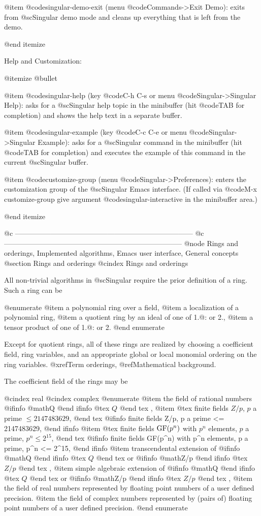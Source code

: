 @item @code{singular-demo-exit} (menu @code{Commands->Exit Demo}):
exits from @sc{Singular} demo mode and cleans up everything that is
left from the demo.

@end itemize

Help and Customization:

@itemize @bullet

@item @code{singular-help} (key @code{C-h C-s} or menu
@code{Singular->Singular Help}): asks for a @sc{Singular} help topic in
the minibuffer (hit @code{TAB} for completion) and shows the help text
in a separate buffer.

@item @code{singular-example} (key @code{C-c C-e} or menu
@code{Singular->Singular Example}): asks for a @sc{Singular} command in
the minibuffer (hit @code{TAB} for completion) and executes the example
of this command in the current @sc{Singular} buffer.

@item @code{customize-group} (menu @code{Singular->Preferences}): enters
the customization group of the @sc{Singular} Emacs interface. (If called
via @code{M-x customize-group} give argument @code{singular-interactive}
in the minibuffer area.)

@end itemize


@c ---------------------------------------------------------------------------
@c ---------------------------------------------------------------------------
@node Rings and orderings, Implemented algorithms, Emacs user interface, General concepts
@section Rings and orderings
@cindex Rings and orderings

All non-trivial algorithms in @sc{Singular} require the prior definition of
a ring. Such a ring can be

@enumerate
@item
a polynomial ring over a field,
@item
a localization of a polynomial ring,
@item
a quotient ring by an ideal of one of 1.@: or 2.,
@item
a tensor product of one of 1.@: or 2.
@end enumerate

Except for quotient rings, all of these rings are realized by choosing a
coefficient field, ring variables, and an appropriate global or local
monomial ordering on the ring variables.  @xref{Term orderings},
@ref{Mathematical background}.

The coefficient field of the rings may be

@cindex real
@cindex complex
@enumerate
@item
the field of rational numbers 
@ifinfo
@math{Q}
@end ifinfo
@tex
$Q$
@end tex
,
@item
@tex
finite fields $Z/p$, $p$ a prime $\le 2147483629$,
@end tex
@ifinfo
finite fields Z/p, p a prime <= 2147483629,
@end ifinfo
@item
@tex
finite fields $\hbox{GF}(p^n)$ with $p^n$ elements, $p$ a prime, $p^n \le 2^{15}$,
@end tex
@ifinfo
finite fields GF(p^n) with p^n elements, p a prime, p^n <= 2^15,
@end ifinfo
@item
transcendental extension of 
@ifinfo
@math{Q}
@end ifinfo
@tex
$Q$
@end tex
 or 
@ifinfo
@math{Z/p}
@end ifinfo
@tex
$Z/p$
@end tex
,
@item
simple algebraic extension of 
@ifinfo
@math{Q}
@end ifinfo
@tex
$Q$
@end tex
 or 
@ifinfo
@math{Z/p}
@end ifinfo
@tex
$Z/p$
@end tex
,
@item
the field of real numbers represented by floating point
numbers of a user defined precision.
@item
the field of complex numbers represented by (pairs of) floating point
numbers of a user defined precision.
@end enumerate

